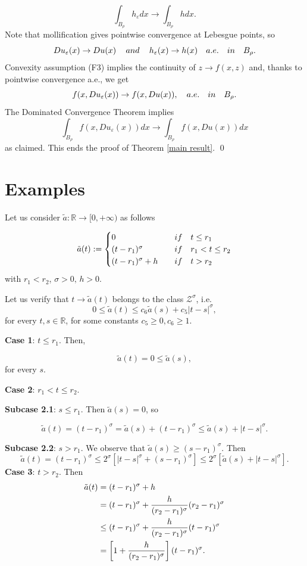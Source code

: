 \documentclass[a4paper,10pt]{article}
\theoremstyle{plain}
\theoremstyle{definition}
\numberwithin{equation}{section} \makeatletter
\begin{document}
\[
\int_{B_{\rho}} h_\varepsilon dx \rightarrow \int_{B_{\rho}} h dx.
\]
\noindent
Note that mollification gives pointwise convergence at Lebesgue points, so
\[
Du_\varepsilon(x)\rightarrow Du(x) \,\quad {\rm and} \quad\, h_\varepsilon(x)\rightarrow h(x)\quad {\rm  a.e.\quad in}\quad  B_{\rho}.
\]
\noindent
Convexity assumption (F3) implies the continuity of $z \rightarrow f(x,z)$ and, thanks to pointwise convergence a.e., we get
\[
f(x,Du_\varepsilon(x)) \rightarrow f(x,Du(x)),\quad {\rm  a.e.\quad in}\quad  B_{\rho}.
\]
The Dominated Convergence Theorem implies
\[
\int_{B_{\rho}} f(x,Du_\varepsilon (x))dx \rightarrow  \int_{B_{\rho}} f(x,Du(x))dx
\]
as claimed. This ends the proof of Theorem \ref{main result}.
\qed


\section{Examples}\label{examples}
\noindent
 Let us consider $\tilde{a}: \mathbb{R} \to [0, +\infty)$ as follows

\begin{equation*}
\tilde{a}(t):=\begin{cases}
0 &\quad{\rm if}\quad   t\leq r_1   \\
(t-r_1)^{\sigma} &\quad{\rm if}\quad r_1 < t \leq r_2 \\
(t-r_1)^{\sigma}+h &\quad {\rm if}\quad t>r_2 
\end{cases}
\end{equation*}
with  $r_1 < r_2$, $\sigma >0,\, h>0
$.




\noindent Let us verify that $t\to \tilde{a}(t)$  belongs to the class $\mathcal Z^\sigma$, i.e.
$$0 \le \tilde{a}(t) \le c_6 \tilde{a}(s)+c_5|t-s|^{\sigma},$$
for every $t,s \in \mathbb{R}$, for some constants $c_5 \geq 0, c_6 \geq 1$.




\noindent
{\bf Case 1}: $t \leq r_1$. Then,

$$
\tilde{a}(t)=0 \leq \tilde{a}(s),
$$
for every $s$.


\noindent
{\bf Case 2}: $ r_1 < t \leq r_2$.  


\noindent
{\bf Subcase 2.1}: $s \leq r_1$. Then $\tilde{a}(s)=0$, so

$$
\tilde{a}(t) = (t-r_1)^\sigma =  \tilde{a}(s) + (t-r_1)^{\sigma} \leq \tilde{a}(s) + |t-s|^{\sigma}.
$$

\noindent
{\bf Subcase 2.2}: $s > r_1$. We observe that $\tilde{a}(s) \geq (s-r_1)^\sigma$. Then
$$
\tilde{a}(t) = (t-r_1)^{\sigma} \leq 2^\sigma [|t-s|^\sigma + (s-r_1)^{\sigma}] \leq 2^\sigma [\tilde{a}(s)+|t-s|^\sigma].
$$
\noindent
{\bf Case 3}: $ t > r_2$.  Then
\begin{align} \label{3.1}
    \tilde{a}(t) & = (t-r_1)^\sigma + h \notag \\ & = (t-r_1)^\sigma + \frac{h}{(r_2 - r_1)^\sigma}(r_2 - r_1)^\sigma \notag \\ & \leq (t-r_1)^\sigma + \frac{h}{(r_2 -r_1)^\sigma}(t-r_1)^\sigma \notag \\ & = \left [ 1+\frac{h}{(r_2 - r_1)^\sigma}\right ](t-r_1)^\sigma.
\end{align}
\end{document}
